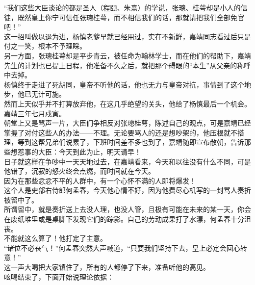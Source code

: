 \begin{multicols}{\theparacolNo}
“我们这些大臣谈论的都是圣人（程颐、朱熹）的学说，张璁、桂萼却是小人的信徒，既然皇上你宁可信任张璁桂萼，而不相信我们的话，那就请把我们全部免官吧！”\\

这一招叫做以退为进，杨慎老爹早就已经用过，实在不新鲜，嘉靖同志看过后只是付之一笑，根本不予理睬。\\

另一方面，张璁桂萼却是平步青云，被任命为翰林学士，而在他们的帮助下，嘉靖先生的计划也已提上日程，他准备不久之后，就把那个碍眼的“本生”从父亲的称呼中去掉。\\

杨慎终于走进了死胡同，皇帝不听他的话，他也无力与皇帝对抗，事情到了这个地步，他已无计可施。\\

然而上天似乎并不打算放弃他，在这几乎绝望的关头，他给了杨慎最后一个机会。\\

嘉靖三年七月戍寅。\\

朝堂上又是骂声一片，大臣们争相反对张璁桂萼，陈述自己的观点，可是嘉靖已经掌握了对付这些人的办法——不理。无论要骂人的还是想吵架的，他压根就不搭理，等到这帮兄弟们说累了，下班时间差不多也到了，嘉靖随即宣布散朝，告诉那些想惹事的大臣：今天到此为止，明天请早！\\

日子就这样在争吵中一天天地过去，在嘉靖看来，今天和以往没有什么不同，可是他错了，沉寂的怒火终会点燃，而时间就在今天。\\

因为在那些忿忿不平的人群中，有一个心怀不满的人即将爆发！\\

这个人是吏部右侍郎何孟春，今天他心情不好，因为他费尽心机写的一封骂人奏折被留中了。\\

所谓留中，就是奏折送上去没人理，也没人管，且极有可能在未来的某一天，你会在废纸堆里或是桌脚下发现它们的踪影。自己的劳动成果打了水漂，何孟春十分沮丧。\\

不能就这么算了！他打定了主意。\\

“诸位不必丧气！”何孟春突然大声喊道，“只要我们坚持下去，皇上必定会回心转意！”\\

这一声大喝把大家镇住了，所有的人都停了下来，准备听他的高见。\\

吆喝结束了，下面开始说理论依据：\\


\end{multicols}
